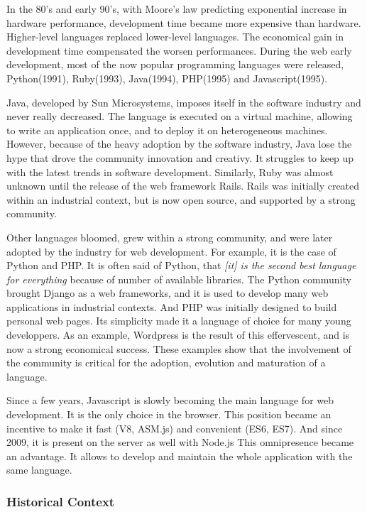 In the 80's and early 90's, with Moore's law predicting exponential increase in hardware performance, development time became more expensive than hardware.
Higher-level languages replaced lower-level languages.
The economical gain in development time compensated the worsen performances.
During the web early development, most of the now popular programming languages were released, Python(1991), Ruby(1993), Java(1994), PHP(1995) and Javascript(1995).

Java, developed by Sun Microsystems, imposes itself in the software industry and never really decreased.
The language is executed on a virtual machine, allowing to write an application once, and to deploy it on heterogeneous machines.
However, because of the heavy adoption by the software industry, Java lose the hype that drove the community innovation and creativy.
It struggles to keep up with the latest trends in software development.
Similarly, Ruby was almost unknown until the release of the web framework Rails.
Rails was initially created within an industrial context, but is now open source, and supported by a strong community.

Other languages bloomed, grew within a strong community, and were later adopted by the industry for web development.
For example, it is the case of Python and PHP.
It is often said of Python, that \textit{[it] is the second best language for everything} because of number of available libraries.
The Python community brought Django as a web frameworks, and it is used to develop many web applications in industrial contexts.
And PHP was initially designed to build personal web pages.
Its simplicity made it a language of choice for many young developpers.
As an example, Wordpress is the result of this effervescent, and is now a strong economical success.
These examples show that the involvement of the community is critical for the adoption, evolution and maturation of a language.

Since a few years, Javascript is slowly becoming the main language for web development.
It is the only choice in the browser.
This position became an incentive to make it fast (V8, ASM.js) and convenient (ES6, ES7).
And since 2009, it is present on the server as well with Node.js
This omnipresence became an advantage.
It allows to develop and maintain the whole application with the same language.

\subsubsection{Historical Context}

